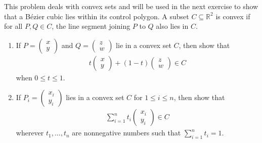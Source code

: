 \begin{exercise}{14}
This problem deals with convex sets and will be used in the next exercise to show that a B\'ezier cubic lies within its control polygon. 
A subset $C\subseteq \mathbb{R}^2$ is convex if for all $P,Q\in C$, the line segment joining $P$ to $Q$ also lies in $C$.
\begin{enumerate}
    \item If 
    $P = 
    \left(\begin{array}{c} 
        x\\ 
        y
    \end{array}\right)$ 
    and 
    $Q = 
    \left(\begin{array}{c} 
        z\\ 
        w
    \end{array}\right)$ lie in a convex set $C$, then show that
    \begin{align*}
        t\left(\begin{array}{c} 
            x\\ 
            y\end{array}\right) 
        + (1-t)
        \left(\begin{array}{c} 
            z\\ 
            w\end{array}\right)
        \in C
    \end{align*}
    when $0\leq t\leq 1$.
    \item If 
    $P_i = 
    \left(\begin{array}{c} 
        x_i\\ 
        y_i\end{array}\right)$ 
    lies in a convex set $C$ for $1\leq i \leq n$, then show that
    \begin{align*}
        \sum_{i=1}^n t_i 
        \left(\begin{array}{c} 
            x_i\\ 
            y_i\end{array}\right)
        \in C
    \end{align*}
    wherever $t_1,\dots,t_n$ are nonnegative numbers such that $\sum_{i=1}^n t_i = 1$. 
\end{enumerate}
\end{exercise}
